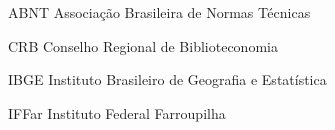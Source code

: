 \begin{siglas}
  \item[ABNT] Associação Brasileira de Normas Técnicas
  \item[CRB] Conselho Regional de Biblioteconomia
  \item[IBGE] Instituto Brasileiro de Geografia e Estatística
  \item[IFFar] Instituto Federal Farroupilha
\end{siglas}